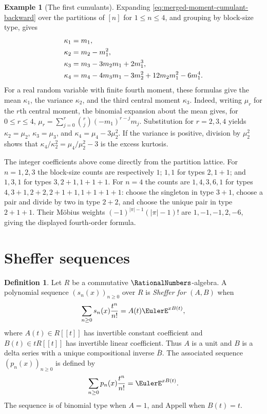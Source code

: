 \documentclass[11pt,a4paper,oneside,openany]{book}
\theoremstyle{definition}
\newtheorem{definition}[theorem]{Definition}
\newtheorem{example}[theorem]{Example}
\theoremstyle{remark}
\begin{document}
\begin{example}[The first cumulants]\label{ex:merged-first-cumulants}
Expanding \eqref{eq:merged-moment-cumulant-backward} over the partitions of
$[n]$ for $1\leq n\leq4$, and grouping by block-size type, gives
\begin{align}
 \kappa_1&=m_1,                                                    \notag\\
 \kappa_2&=m_2-m_1^2,                                              \notag\\
 \kappa_3&=m_3-3m_2m_1+2m_1^3,                                     \notag\\
 \kappa_4&=m_4-4m_3m_1-3m_2^2+12m_2m_1^2-6m_1^4.                   \label{eq:merged-first-cumulants}
\end{align}
For a real random variable with finite fourth moment, these formulas give
the mean $\kappa_1$, the variance $\kappa_2$, and the third central moment
$\kappa_3$.  Indeed, writing $\mu_r$ for the $r$th central moment, the
binomial expansion about the mean gives, for $0\leq r\leq4$,
$\mu_r=\sum_{j=0}^r\binom rj(-m_1)^{r-j}m_j$.
Substitution for $r=2,3,4$ yields
$\kappa_2=\mu_2$, $\kappa_3=\mu_3$, and
$\kappa_4=\mu_4-3\mu_2^2$.
If the variance is positive, division by $\mu_2^2$ shows that
$\kappa_4/\kappa_2^2=\mu_4/\mu_2^2-3$ is the excess kurtosis.

The integer coefficients above come directly from the partition lattice.
For $n=1,2,3$ the block-size counts are respectively $1$;
$1,1$ for types $2,1+1$; and $1,3,1$ for types $3,2+1,1+1+1$.
For $n=4$ the counts are $1,4,3,6,1$ for types
$4,3+1,2+2,2+1+1,1+1+1+1$: choose the singleton in type $3+1$,
choose a pair and divide by two in type $2+2$, and choose the unique
pair in type $2+1+1$.
Their Möbius weights $(-1)^{|\pi|-1}(|\pi|-1)!$ are
$1,-1,-1,2,-6$, giving the displayed fourth-order formula.
\end{example}

\section{Sheffer sequences}

\begin{definition}
Let $R$ be a commutative $\RationalNumbers$-algebra.  A polynomial sequence
$(s_n(x))_{n\geq0}$ over $R$ is \emph{Sheffer for $(A,B)$} when
\begin{equation}
 \sum_{n\geq0}s_n(x)\frac{t^n}{n!}=A(t)\EulerE^{xB(t)},                   \label{eq:merged-sheffer-egf}
\end{equation}
where $A(t)\in R[[t]]$ has invertible constant coefficient and
$B(t)\in tR[[t]]$ has invertible linear coefficient.  Thus $A$ is a unit and
$B$ is a delta series with a unique compositional inverse $\overline B$.
The associated sequence $(p_n(x))_{n\geq0}$ is defined by
\[
 \sum_{n\geq0}p_n(x)\frac{t^n}{n!}=\EulerE^{xB(t)}.
\]
The sequence is of binomial type when $A=1$, and Appell when $B(t)=t$.
\end{definition}
\end{document}
